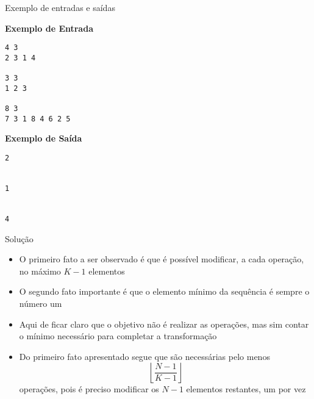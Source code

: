 \begin{frame}[fragile]{Exemplo de entradas e saídas}

\begin{minipage}[t]{0.5\textwidth}
\textbf{Exemplo de Entrada}
\begin{verbatim}
4 3
2 3 1 4

3 3
1 2 3

8 3
7 3 1 8 4 6 2 5
\end{verbatim}
\end{minipage}
\begin{minipage}[t]{0.45\textwidth}
\textbf{Exemplo de Saída}
\begin{verbatim}
2


1


4
\end{verbatim}
\end{minipage}
\end{frame}

\begin{frame}[fragile]{Solução}

    \begin{itemize}
        \item O primeiro fato a ser observado é que é possível modificar, a cada operação, no
            máximo $K - 1$ elementos

        \item O segundo fato importante é que o elemento mínimo da sequência é sempre o número
            um

        \item Aqui de ficar claro que o objetivo não é realizar as operações, mas sim contar o
            mínimo necessário para completar a transformação

        \item Do primeiro fato apresentado segue que são necessárias pelo menos 
        \[
            \left\lfloor \frac{N - 1}{K - 1} \right\rfloor
        \] operações,  pois é preciso modificar os $N - 1$ elementos restantes, um por vez
    \end{itemize}

\end{frame}


